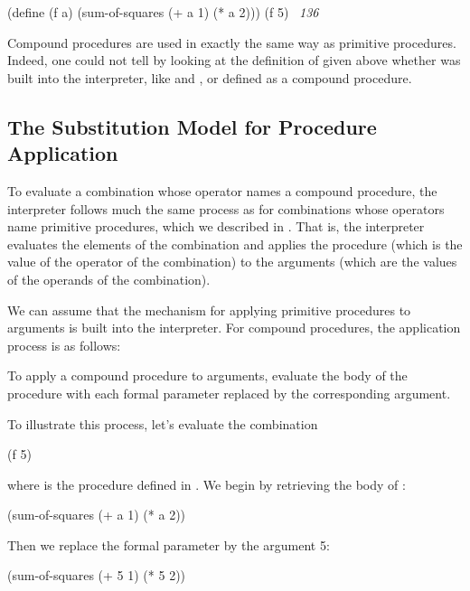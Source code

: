 \begin{codeBlock}
(define (f a)
  (sum-of-squares (+ a 1) (* a 2)))
(f 5)
~\textit{136}~
\end{codeBlock}

\noindent
Compound procedures are used in exactly the same way as primitive procedures.
Indeed, one could not tell by looking at the definition of
 given above whether  was built into the
interpreter, like \code{+} and \code{*}, or defined as a compound procedure.

\subsection{The Substitution Model for Procedure Application}
\label{Section 1.1.5}

To evaluate a combination whose operator names a compound procedure, the
interpreter follows much the same process as for combinations whose operators
name primitive procedures, which we described in .  That is,
the interpreter evaluates the elements of the combination and applies the
procedure (which is the value of the operator of the combination) to the
arguments (which are the values of the operands of the combination).

We can assume that the mechanism for applying primitive procedures to arguments
is built into the interpreter.  For compound procedures, the application
process is as follows:

\begin{niceQuote}
To apply a compound procedure to arguments, evaluate the body of the procedure
with each formal parameter replaced by the corresponding argument.
\end{niceQuote}

\noindent
To illustrate this process, let's evaluate the combination

\begin{codeBlock}
(f 5)
\end{codeBlock}

\noindent
where  is the procedure defined in .  We begin by
retrieving the body of :

\begin{codeBlock}
(sum-of-squares (+ a 1) (* a 2))
\end{codeBlock}

\noindent
Then we replace the formal parameter  by the argument 5:

\begin{codeBlock}
(sum-of-squares (+ 5 1) (* 5 2))
\end{codeBlock}

